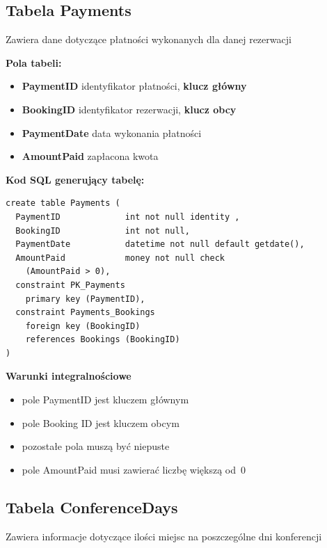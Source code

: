 \documentclass[12pt, a4paper]{mwrep}
\begin{document}
\newpage
\subsection{Tabela Payments}

\noindent Zawiera dane dotyczące płatności wykonanych dla danej rezerwacji

\vspace{0.5cm}

\noindent \textbf{Pola tabeli:}
\begin{itemize}
  \item \textbf{PaymentID} \ppauza identyfikator płatności, \textbf{klucz główny}
  \item \textbf{BookingID} \ppauza identyfikator rezerwacji, \textbf{klucz obcy}
  \item \textbf{PaymentDate} \ppauza data wykonania płatności
  \item \textbf{AmountPaid} \ppauza zapłacona kwota
\end{itemize}

\vspace{0.5cm}
\noindent \textbf{Kod SQL generujący tabelę:}

\begin{lstlisting}
create table Payments (
  PaymentID             int not null identity ,
  BookingID             int not null,
  PaymentDate           datetime not null default getdate(),
  AmountPaid            money not null check
    (AmountPaid > 0),
  constraint PK_Payments 
    primary key (PaymentID),
  constraint Payments_Bookings 
    foreign key (BookingID) 
    references Bookings (BookingID)
)
\end{lstlisting}

\vspace{0.5cm}
\noindent \textbf{Warunki integralnościowe}
\begin{itemize}
  \item pole PaymentID jest kluczem głównym
  \item pole Booking ID jest kluczem obcym
  \item pozostałe pola muszą być niepuste
  \item pole AmountPaid musi zawierać liczbę większą od~0
\end{itemize}

\subsection{Tabela ConferenceDays}

\noindent Zawiera informacje dotyczące ilości miejsc na poszczególne dni konferencji
\end{document}
